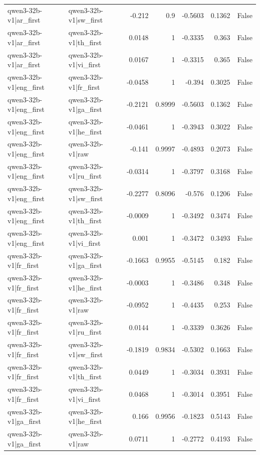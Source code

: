 \begin{table}
\begin{tabular}{l l r r r r l}
qwen3-32b-v1|ar_first & qwen3-32b-v1|sw_first & -0.212 & 0.9 & -0.5603 & 0.1362 & False \\
qwen3-32b-v1|ar_first & qwen3-32b-v1|th_first & 0.0148 & 1 & -0.3335 & 0.363 & False \\
qwen3-32b-v1|ar_first & qwen3-32b-v1|vi_first & 0.0167 & 1 & -0.3315 & 0.365 & False \\
qwen3-32b-v1|eng_first & qwen3-32b-v1|fr_first & -0.0458 & 1 & -0.394 & 0.3025 & False \\
qwen3-32b-v1|eng_first & qwen3-32b-v1|ga_first & -0.2121 & 0.8999 & -0.5603 & 0.1362 & False \\
qwen3-32b-v1|eng_first & qwen3-32b-v1|he_first & -0.0461 & 1 & -0.3943 & 0.3022 & False \\
qwen3-32b-v1|eng_first & qwen3-32b-v1|raw & -0.141 & 0.9997 & -0.4893 & 0.2073 & False \\
qwen3-32b-v1|eng_first & qwen3-32b-v1|ru_first & -0.0314 & 1 & -0.3797 & 0.3168 & False \\
qwen3-32b-v1|eng_first & qwen3-32b-v1|sw_first & -0.2277 & 0.8096 & -0.576 & 0.1206 & False \\
qwen3-32b-v1|eng_first & qwen3-32b-v1|th_first & -0.0009 & 1 & -0.3492 & 0.3474 & False \\
qwen3-32b-v1|eng_first & qwen3-32b-v1|vi_first & 0.001 & 1 & -0.3472 & 0.3493 & False \\
qwen3-32b-v1|fr_first & qwen3-32b-v1|ga_first & -0.1663 & 0.9955 & -0.5145 & 0.182 & False \\
qwen3-32b-v1|fr_first & qwen3-32b-v1|he_first & -0.0003 & 1 & -0.3486 & 0.348 & False \\
qwen3-32b-v1|fr_first & qwen3-32b-v1|raw & -0.0952 & 1 & -0.4435 & 0.253 & False \\
qwen3-32b-v1|fr_first & qwen3-32b-v1|ru_first & 0.0144 & 1 & -0.3339 & 0.3626 & False \\
qwen3-32b-v1|fr_first & qwen3-32b-v1|sw_first & -0.1819 & 0.9834 & -0.5302 & 0.1663 & False \\
qwen3-32b-v1|fr_first & qwen3-32b-v1|th_first & 0.0449 & 1 & -0.3034 & 0.3931 & False \\
qwen3-32b-v1|fr_first & qwen3-32b-v1|vi_first & 0.0468 & 1 & -0.3014 & 0.3951 & False \\
qwen3-32b-v1|ga_first & qwen3-32b-v1|he_first & 0.166 & 0.9956 & -0.1823 & 0.5143 & False \\
qwen3-32b-v1|ga_first & qwen3-32b-v1|raw & 0.0711 & 1 & -0.2772 & 0.4193 & False \\

\end{tabular}
\end{table}
